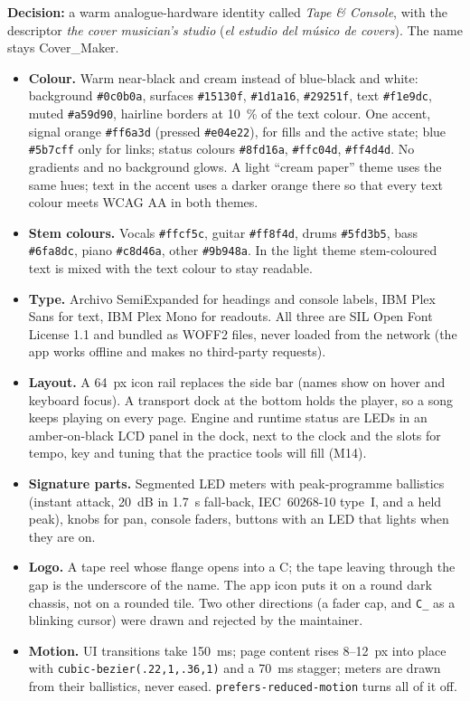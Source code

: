 \textbf{Decision:} a warm analogue-hardware identity called \emph{Tape \&
Console}, with the descriptor \emph{the cover musician's studio}
(\emph{el estudio del músico de covers}). The name stays Cover\_Maker.
\begin{itemize}
  \item \textbf{Colour.} Warm near-black and cream instead of blue-black and
        white: background \texttt{\#0c0b0a}, surfaces \texttt{\#15130f},
        \texttt{\#1d1a16}, \texttt{\#29251f}, text \texttt{\#f1e9dc}, muted
        \texttt{\#a59d90}, hairline borders at 10~\% of the text colour. One
        accent, signal orange \texttt{\#ff6a3d} (pressed \texttt{\#e04e22}),
        for fills and the active state; blue \texttt{\#5b7cff} only for links;
        status colours \texttt{\#8fd16a}, \texttt{\#ffc04d}, \texttt{\#ff4d4d}.
        No gradients and no background glows. A light ``cream paper'' theme
        uses the same hues; text in the accent uses a darker orange there so
        that every text colour meets WCAG AA in both themes.
  \item \textbf{Stem colours.} Vocals \texttt{\#ffcf5c}, guitar
        \texttt{\#ff8f4d}, drums \texttt{\#5fd3b5}, bass \texttt{\#6fa8dc},
        piano \texttt{\#c8d46a}, other \texttt{\#9b948a}. In the light theme
        stem-coloured text is mixed with the text colour to stay readable.
  \item \textbf{Type.} Archivo SemiExpanded for headings and console labels,
        IBM Plex Sans for text, IBM Plex Mono for readouts. All three are SIL
        Open Font License 1.1 and bundled as WOFF2 files, never loaded from
        the network (the app works offline and makes no third-party requests).
  \item \textbf{Layout.} A 64~px icon rail replaces the side bar (names show on
        hover and keyboard focus). A transport dock at the bottom holds the
        player, so a song keeps playing on every page. Engine and runtime status
        are LEDs in an amber-on-black LCD panel in the dock, next to the clock
        and the slots for tempo, key and tuning that the practice tools will
        fill (M14).
  \item \textbf{Signature parts.} Segmented LED meters with peak-programme
        ballistics (instant attack, 20~dB in 1.7~s fall-back, IEC~60268-10
        type~I, and a held peak), knobs for pan, console faders, buttons with
        an LED that lights when they are on.
  \item \textbf{Logo.} A tape reel whose flange opens into a C; the tape
        leaving through the gap is the underscore of the name. The app icon
        puts it on a round dark chassis, not on a rounded tile. Two other
        directions (a fader cap, and \texttt{C\_} as a blinking cursor) were
        drawn and rejected by the maintainer.
  \item \textbf{Motion.} UI transitions take 150~ms; page content rises
        8--12~px into place with \texttt{cubic-bezier(.22,1,.36,1)} and a
        70~ms stagger; meters are drawn from their ballistics, never eased.
        \texttt{prefers-reduced-motion} turns all of it off.
\end{itemize}

